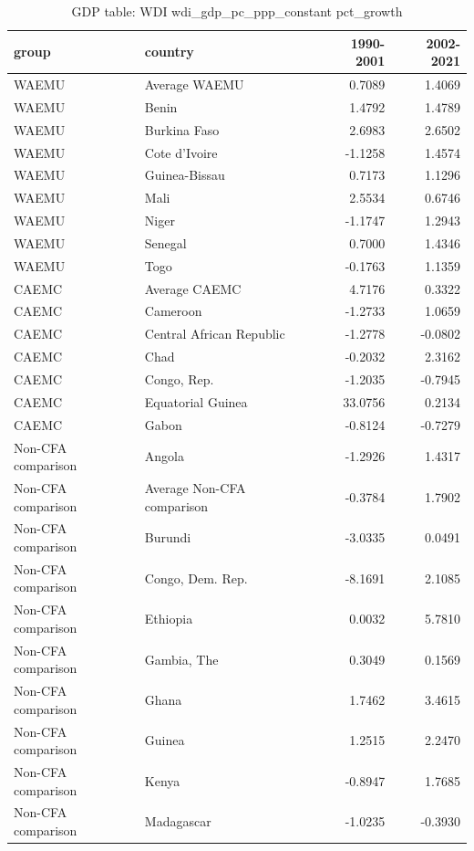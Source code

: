 \begin{table}

\caption{GDP table: WDI wdi_gdp_pc_ppp_constant pct_growth}
\centering
\begin{tabular}[t]{llrr}
\toprule
group & country & 1990-2001 & 2002-2021\\
\midrule
WAEMU & Average WAEMU & 0.7089 & 1.4069\\
WAEMU & Benin & 1.4792 & 1.4789\\
WAEMU & Burkina Faso & 2.6983 & 2.6502\\
WAEMU & Cote d'Ivoire & -1.1258 & 1.4574\\
WAEMU & Guinea-Bissau & 0.7173 & 1.1296\\
\addlinespace
WAEMU & Mali & 2.5534 & 0.6746\\
WAEMU & Niger & -1.1747 & 1.2943\\
WAEMU & Senegal & 0.7000 & 1.4346\\
WAEMU & Togo & -0.1763 & 1.1359\\
CAEMC & Average CAEMC & 4.7176 & 0.3322\\
\addlinespace
CAEMC & Cameroon & -1.2733 & 1.0659\\
CAEMC & Central African Republic & -1.2778 & -0.0802\\
CAEMC & Chad & -0.2032 & 2.3162\\
CAEMC & Congo, Rep. & -1.2035 & -0.7945\\
CAEMC & Equatorial Guinea & 33.0756 & 0.2134\\
\addlinespace
CAEMC & Gabon & -0.8124 & -0.7279\\
Non-CFA comparison & Angola & -1.2926 & 1.4317\\
Non-CFA comparison & Average Non-CFA comparison & -0.3784 & 1.7902\\
Non-CFA comparison & Burundi & -3.0335 & 0.0491\\
Non-CFA comparison & Congo, Dem. Rep. & -8.1691 & 2.1085\\
\addlinespace
Non-CFA comparison & Ethiopia & 0.0032 & 5.7810\\
Non-CFA comparison & Gambia, The & 0.3049 & 0.1569\\
Non-CFA comparison & Ghana & 1.7462 & 3.4615\\
Non-CFA comparison & Guinea & 1.2515 & 2.2470\\
Non-CFA comparison & Kenya & -0.8947 & 1.7685\\
\addlinespace
Non-CFA comparison & Madagascar & -1.0235 & -0.3930\\

\end{tabular}
\end{table}
